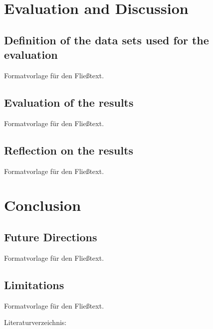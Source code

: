 \documentclass[a4paper,12pt,twoside]{scrreprt}
\begin{document}
\chapter{Evaluation and Discussion}

\section{Definition of the data sets used for the evaluation}
Formatvorlage für den Fließtext.

\section{Evaluation of the results}
Formatvorlage für den Fließtext.

\section{Reflection on the results}
Formatvorlage für den Fließtext.

\chapter{Conclusion}

\section{Future Directions}
Formatvorlage für den Fließtext.

\section{Limitations}
Formatvorlage für den Fließtext.

Literaturverzeichnis:
\clearpage
{}
{}
\printbibliography


\end{document}
